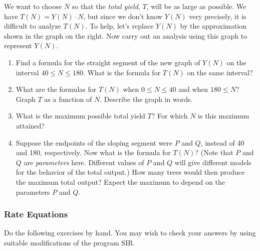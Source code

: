 We want to choose $N$ so that the {\em total yield}, $T$, will be as
large as possible.  We have $T(N) = Y(N) \cdot N$, but since we don't
know $Y(N)$ very precisely, it is difficult to analyze $T(N)$.  To
help, let's replace $Y(N)$ by the approximation shown in the graph on
the right.  Now carry out an analysis using this graph to represent
$Y(N)$.


\begin{enumerate}
\item Find a formula for the straight segment of the new graph of
$Y(N)$ on the interval $40 \leq N \leq 180$.  What is the formula for
$T(N)$ on the same interval?


\item What are the formulas for $T(N)$ when $0 \leq N \leq 40$ and when
$180 \leq N$?  Graph $T$ as a function of $N$.  Describe the graph in
words.


\item What is the maximum possible total yield $T$?  For which $N$ is
this maximum attained?


\item Suppose the endpoints of the sloping segment were $P$ and $Q$,
instead of 40 and 180, respectively.  Now what is the formula for
$T(N)$?  (Note that $P$ and $Q$ are {\em parameters\/} here.
Different values of $P$ and $Q$ will give different models for the
behavior of the total output.)  How many trees would then produce the
maximum total output?  Expect the maximum to depend on the parameters
$P$ and $Q$.


\end{enumerate}
\subsubsection{Rate Equations}
\label{subsubsec:rate-equations}

Do the following exercises by hand.  You may wish to check your
answers by using suitable modifications of the program SIR.


